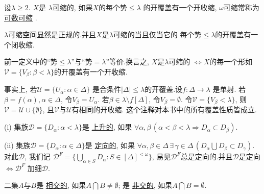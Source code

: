 \documentclass[main.tex]{subfiles}
\begin{document}
\begin{definition} \label{def:1.2.1}
设$\lambda \ge2$. $X$是
\underline{$\lambda$可缩的},
如果$X$的每个势$\le \lambda$
的开覆盖有一个开收缩, $\omega$可缩常称为
\underline{可数可缩}
.
\end{definition}
$\lambda$可缩空间显然是正规的.并且$X$是$\lambda$可缩的当且仅当它的
每个势$\le \lambda$的开覆盖有一个闭收缩.

\begin{note} \label{note:1.2.2}
前一定义中的“势$\le \lambda$”与“势$= \lambda$”等价.换言之,
$X$是$\lambda$可缩的 $\Leftrightarrow X$的每一个形如
$\mathscr{V}=\{V_\beta: \beta<\lambda\}$的开覆盖有一个开收缩. 

事实上, 若$\mathscr{U}=\{U_\alpha: \alpha\in\Delta\}$
是合条件$|\Delta|\le\lambda$的开覆盖.设$f: \Delta\to\lambda$
是单射. 若$\beta = f(\alpha), \alpha\in \Delta$, 令$V_\beta = U_\alpha$.
若$\beta\in \lambda\setminus f[\Delta]$, 令$V_\beta = \emptyset$.
令$\mathscr{V}=\{V_\beta<\lambda\}$, 则$\mathscr{V}=\mathscr{U}\cup \{\emptyset\}$,
且$\mathscr{V}$与$\mathscr{U}$有相同的开收缩. 
这个注释对本书中的所有覆盖性质皆成立.
\end{note}

\begin{definition} \label{def:1.2.3}
(i)  集族$\mathscr{D}=\{D_\alpha: \alpha<\lambda\}$是
\underline{上升的},
如果
$\forall\alpha, \beta \,(\alpha < \beta < \lambda \Rightarrow D_\alpha \subset D_\beta )$.

\textnormal{(ii)}  集族$\mathscr{D}=\{D_\alpha: \alpha\in\Delta\}$是
\underline{定向的},
如果
$\forall\alpha, \beta\in\Delta\,\exists \, \gamma\in \Delta\,
(D_\alpha \bigcup D_\beta \subset D_\gamma)$.
对此$\mathscr{D}$, 我们记
$\mathscr{D}^F = \{\bigcup_{\alpha\in S} D_\alpha: S\in [\Delta]^{<\omega}\}$,
易见$\mathscr{D}^F$总是定向的.并且$\mathscr{D}$是定向
$\Leftrightarrow \mathscr{D}^F$ 加细$\mathscr{D}$.
\end{definition}
二集$A$与$B$是
\underline{相交的},
如果$A\bigcap B\ne \emptyset$;
是
\underline{非交的},
如果$A\bigcap B=\emptyset$.
\end{document}
